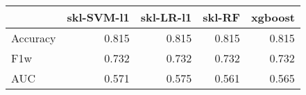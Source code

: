 \begin{tabular}{lrrrr}
\toprule
{} &  skl-SVM-l1 &  skl-LR-l1 &  skl-RF &  xgboost \\
\midrule
Accuracy &       0.815 &      0.815 &   0.815 &    0.815 \\
F1w      &       0.732 &      0.732 &   0.732 &    0.732 \\
AUC      &       0.571 &      0.575 &   0.561 &    0.565 \\
\bottomrule
\end{tabular}
